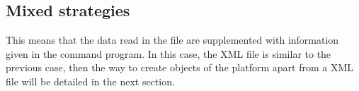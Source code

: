 

\subsection{Mixed strategies}
This means that the data read in the file are supplemented with information given in the command
program.
In this case, the XML file is similar to the previous case, then the way to create objects of
the platform apart from a XML file will be detailed in the next section.






